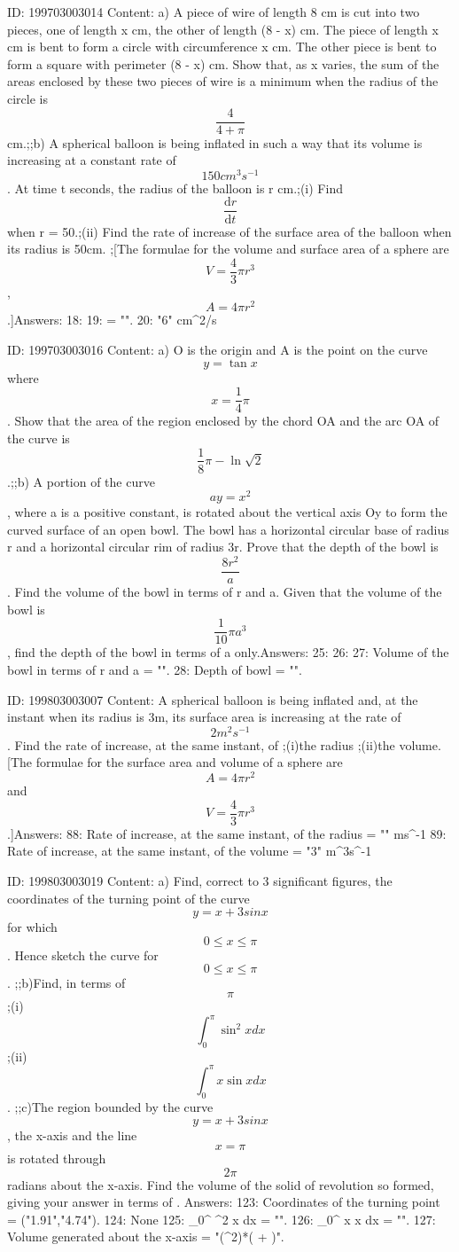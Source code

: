 \documentclass{article}
\begin{document}
ID: 199703003014
Content:
a) A piece of wire of length 8 cm is cut into two pieces, one of length x cm, the other of length (8 - x) cm. The piece of length x cm is bent to form a circle with circumference x cm. The other piece is bent to form a square with perimeter (8 - x) cm. Show that, as x varies, the sum of the areas enclosed by these two pieces of wire is a minimum when the radius of the circle is \[\frac{4}{4 + \pi}\] cm.;;b) A spherical balloon is being inflated in such a way that its volume is increasing at a constant rate of \[150cm^{3}s^{-1}\]. At time t seconds, the radius of the balloon is r cm.;(i) Find \[\frac{\mathrm{d} r}{\mathrm{d} t}\] when r = 50.;(ii) Find the rate of increase of the surface area of the balloon when its radius is 50cm. ;[The formulae for the volume and surface area of a sphere are \[V = \frac{4}{3}\pi r^{3}\], \[A = 4\pi r^{2}\].]Answers:
18: 
19:  = "".
20: "6" cm^2/s

ID: 199703003016
Content:
a) O is the origin and A is the point on the curve \[y = \tan x\] where \[x = \frac {1}{4} \pi\]. Show that the area of the region enclosed by the chord OA and the arc OA of the curve is \[\frac {1}{8} \pi - \ln \sqrt{2}\].;;b) A portion of the curve \[ay = x^{2}\], where a is a positive constant, is rotated about the vertical axis Oy to form the curved surface of an open bowl. The bowl has a horizontal circular base of radius r and a horizontal circular rim of radius 3r. Prove that the depth of the bowl is \[\frac {8r^{2}}{a}\].  Find the volume of the bowl in terms of r and a. Given that the volume of the bowl is \[\frac {1}{10} \pi a^{3}\], find the depth of the bowl in terms of a only.Answers:
25: 
26: 
27: Volume of the bowl in terms of r and a = "".
28: Depth of bowl = "".

ID: 199803003007
Content:
A spherical balloon is being inflated and, at the instant when its radius is 3m, its surface area is increasing at the rate of $$2 m^2 s^{- 1}$$. Find the rate of increase, at the same instant, of  ;(i)the radius ;(ii)the volume. [The formulae for the surface area and volume of a sphere are $$A = 4\pi r^2$$  and $$V = \frac{4}{3}\pi r^3$$.]Answers:
88: Rate of increase, at the same instant, of the radius = "" ms^{-1}
89: Rate of increase, at the same instant, of the volume = "3" m^3s^{-1}

ID: 199803003019
Content:
a) Find, correct to 3 significant figures, the coordinates of the turning point of the curve $$y = x + 3 sin x$$ for which $$0 \leq x \leq \pi$$. Hence sketch the curve for $$0 \leq x \leq \pi$$. ;;b)Find, in terms of $$\pi$$ ;(i)$$\int^{\pi}_0 {\sin}^2 x dx$$ ;(ii)$$\int^{\pi}_0 x \sin x dx$$. ;;c)The region bounded by the curve $$y = x + 3 sin x$$, the x-axis and the line $$x = \pi$$ is rotated through $$2\pi$$ radians about the x-axis. Find the volume of the solid of revolution so formed, giving your answer in terms of  . Answers:
123: Coordinates of the turning point = ("1.91","4.74").
124: None
125: \int_0^{\pi} \sin^{2} x dx = "".
126: \int_0^{\pi} x \sin x dx = "\pi".
127: Volume generated about the x-axis = "(\pi^2)*( + )".
\end{document}
